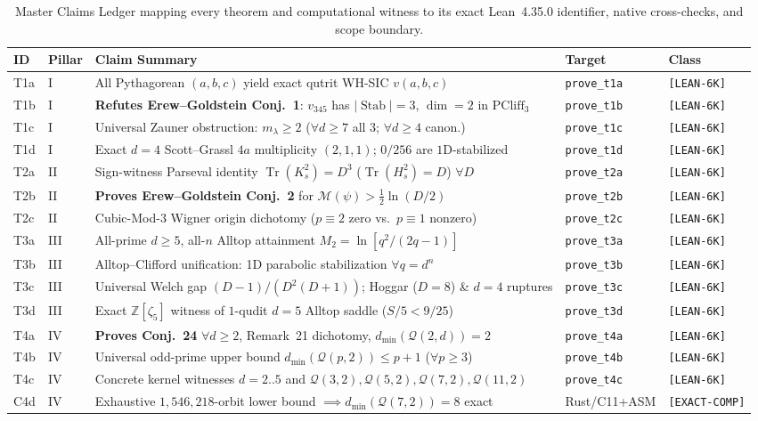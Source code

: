 \documentclass[11pt,letterpaper]{article}
\theoremstyle{plain}
\theoremstyle{definition}
\theoremstyle{remark}
\newcommand{\Z}{\mathbb{Z}}
\newcommand{\Tr}{\operatorname{Tr}}
\newcommand{\Stab}{\operatorname{Stab}}
\newcommand{\PCliff}{\mathrm{PCliff}}
\newcommand{\Qcode}{\mathcal{Q}}
\newcommand{\Mana}{\mathcal{M}}
\newcommand{\leanref}[1]{\textnormal{\texttt{\footnotesize #1}}}
\newcommand{\tagbadge}[1]{\textnormal{\texttt{\small [#1]}}}
\begin{document}
\begin{table}[t]
\centering
\caption{Master Claims Ledger mapping every theorem and computational witness to its exact Lean~4.35.0 identifier, native cross-checks, and scope boundary.}
\label{tab:claims}
\footnotesize
\begin{tabularx}{\textwidth}{@{}llLll@{}}
\toprule
\textbf{ID} & \textbf{Pillar} & \textbf{Claim Summary} & \textbf{Target} & \textbf{Class} \\
\midrule
T1a & I & All Pythagorean $(a,b,c)$ yield exact qutrit WH-SIC $v(a,b,c)$ & \leanref{prove\_t1a} & \tagbadge{LEAN-6K} \\
T1b & I & \textbf{Refutes Erew--Goldstein Conj.~1}: $v_{345}$ has $|\Stab|=3$, $\dim=2$ in $\PCliff_3$ & \leanref{prove\_t1b} & \tagbadge{LEAN-6K} \\
T1c & I & Universal Zauner obstruction: $m_\lambda\ge 2$ ($\forall d\ge 7$ all 3; $\forall d\ge 4$ canon.) & \leanref{prove\_t1c} & \tagbadge{LEAN-6K} \\
T1d & I & Exact $d=4$ Scott--Grassl $4a$ multiplicity $(2,1,1)$; $0/256$ are $1$D-stabilized & \leanref{prove\_t1d} & \tagbadge{LEAN-6K} \\
T2a & II & Sign-witness Parseval identity $\Tr(K_s^2)=D^3$ ($\Tr(H_s^2)=D$) $\forall D$ & \leanref{prove\_t2a} & \tagbadge{LEAN-6K} \\
T2b & II & \textbf{Proves Erew--Goldstein Conj.~2} for $\Mana(\psi)>\tfrac{1}{2}\ln(D/2)$ & \leanref{prove\_t2b} & \tagbadge{LEAN-6K} \\
T2c & II & Cubic-Mod-3 Wigner origin dichotomy ($p\equiv 2$ zero vs.\ $p\equiv 1$ nonzero) & \leanref{prove\_t2c} & \tagbadge{LEAN-6K} \\
T3a & III & All-prime $d\ge 5$, all-$n$ Alltop attainment $M_2=\ln[q^2/(2q-1)]$ & \leanref{prove\_t3a} & \tagbadge{LEAN-6K} \\
T3b & III & Alltop--Clifford unification: 1D parabolic stabilization $\forall q=d^n$ & \leanref{prove\_t3b} & \tagbadge{LEAN-6K} \\
T3c & III & Universal Welch gap $(D-1)/(D^2(D+1))$; Hoggar ($D=8$) \& $d=4$ ruptures & \leanref{prove\_t3c} & \tagbadge{LEAN-6K} \\
T3d & III & Exact $\Z[\zeta_5]$ witness of $1$-qudit $d=5$ Alltop saddle ($S/5<9/25$) & \leanref{prove\_t3d} & \tagbadge{LEAN-6K} \\
T4a & IV & \textbf{Proves Conj.~24} $\forall d\ge 2$, Remark~21 dichotomy, $d_{\min}(\Qcode(2,d))=2$ & \leanref{prove\_t4a} & \tagbadge{LEAN-6K} \\
T4b & IV & Universal odd-prime upper bound $d_{\min}(\Qcode(p,2))\le p+1$ ($\forall p\ge 3$) & \leanref{prove\_t4b} & \tagbadge{LEAN-6K} \\
T4c & IV & Concrete kernel witnesses $d=2..5$ and $\Qcode(3,2),\Qcode(5,2),\Qcode(7,2),\Qcode(11,2)$ & \leanref{prove\_t4c} & \tagbadge{LEAN-6K} \\
C4d & IV & Exhaustive $1{,}546{,}218$-orbit lower bound $\implies d_{\min}(\Qcode(7,2))=8$ exact & Rust/C11+ASM & \tagbadge{EXACT-COMP} \\
\bottomrule
\end{tabularx}
\end{table}
\end{document}
